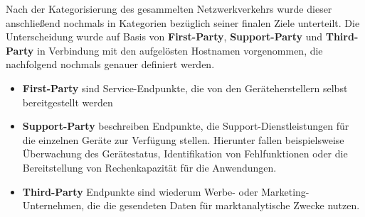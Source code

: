 \noindent Nach der Kategorisierung des gesammelten Netzwerkverkehrs wurde dieser anschließend nochmals in Kategorien bezüglich seiner finalen Ziele unterteilt. Die Unterscheidung wurde auf Basis von \textbf{First-Party}, \textbf{Support-Party} und \textbf{Third-Party} in Verbindung mit den aufgelösten Hostnamen vorgenommen, die nachfolgend nochmals genauer definiert werden.
\begin{itemize}
	\item \textbf{First-Party} sind Service-Endpunkte, die von den Geräteherstellern selbst bereitgestellt werden
	\item \textbf{Support-Party} beschreiben Endpunkte, die Support-Dienstleistungen für die einzelnen Geräte zur Verfügung stellen. Hierunter fallen beispielsweise Überwachung des Gerätestatus, Identifikation von Fehlfunktionen oder die Bereitstellung von Rechenkapazität für die Anwendungen.
	\item \textbf{Third-Party} Endpunkte sind wiederum Werbe- oder Marketing-Unternehmen, die die gesendeten Daten für marktanalytische Zwecke nutzen.
\end{itemize}

